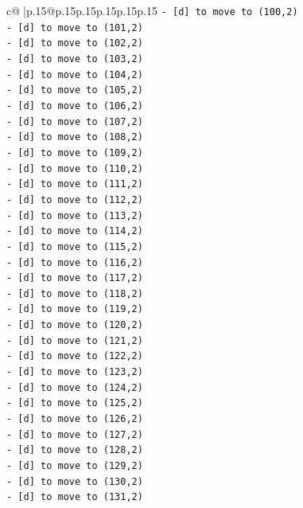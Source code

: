 \documentclass{article}
\begin{document}
{\begin{supertabular}{c@{$\;$}|p{.15\linewidth}@{}p{.15\linewidth}p{.15\linewidth}p{.15\linewidth}p{.15\linewidth}p{.15\linewidth}}
{{{\texttt{{-} {[}d{]} to move to (100,2)} \\
\texttt{{-} {[}d{]} to move to (101,2)} \\
\texttt{{-} {[}d{]} to move to (102,2)} \\
\texttt{{-} {[}d{]} to move to (103,2)} \\
\texttt{{-} {[}d{]} to move to (104,2)} \\
\texttt{{-} {[}d{]} to move to (105,2)} \\
\texttt{{-} {[}d{]} to move to (106,2)} \\
\texttt{{-} {[}d{]} to move to (107,2)} \\
\texttt{{-} {[}d{]} to move to (108,2)} \\
\texttt{{-} {[}d{]} to move to (109,2)} \\
\texttt{{-} {[}d{]} to move to (110,2)} \\
\texttt{{-} {[}d{]} to move to (111,2)} \\
\texttt{{-} {[}d{]} to move to (112,2)} \\
\texttt{{-} {[}d{]} to move to (113,2)} \\
\texttt{{-} {[}d{]} to move to (114,2)} \\
\texttt{{-} {[}d{]} to move to (115,2)} \\
\texttt{{-} {[}d{]} to move to (116,2)} \\
\texttt{{-} {[}d{]} to move to (117,2)} \\
\texttt{{-} {[}d{]} to move to (118,2)} \\
\texttt{{-} {[}d{]} to move to (119,2)} \\
\texttt{{-} {[}d{]} to move to (120,2)} \\
\texttt{{-} {[}d{]} to move to (121,2)} \\
\texttt{{-} {[}d{]} to move to (122,2)} \\
\texttt{{-} {[}d{]} to move to (123,2)} \\
\texttt{{-} {[}d{]} to move to (124,2)} \\
\texttt{{-} {[}d{]} to move to (125,2)} \\
\texttt{{-} {[}d{]} to move to (126,2)} \\
\texttt{{-} {[}d{]} to move to (127,2)} \\
\texttt{{-} {[}d{]} to move to (128,2)} \\
\texttt{{-} {[}d{]} to move to (129,2)} \\
\texttt{{-} {[}d{]} to move to (130,2)} \\
\texttt{{-} {[}d{]} to move to (131,2)} \\
}}}
\end{supertabular}}
\end{document}
